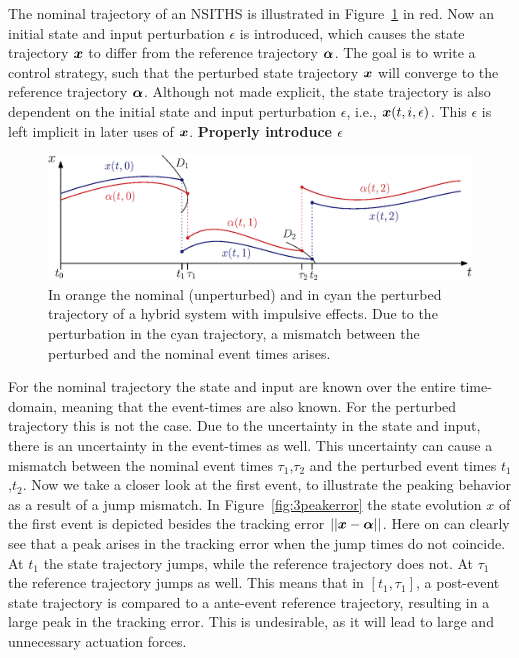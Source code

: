 \documentclass[../DC2017114Bouma.tex]{subfiles}
\begin{document}
The nominal trajectory of an NSITHS is illustrated in Figure~\ref{fig:3perturbedtraj} in red. Now an initial state and input perturbation $\epsilon$ is introduced, which causes the state trajectory ${\boldsymbol{x}}$ to differ from the reference trajectory $\boldsymbol{\alpha}$. The goal is to write a control strategy, such that the perturbed state trajectory ${\boldsymbol{x}}$ will converge to the reference trajectory $\boldsymbol{\alpha}$. Although not made explicit, the state trajectory is also dependent on the initial state and input perturbation $\epsilon$, i.e., ${\boldsymbol{x}}(t,i,\epsilon)$. This $\epsilon$ is left implicit in later uses of ${\boldsymbol{x}}$. \textbf{Properly introduce $\epsilon$}
%
%
\begin{figure}[h]
\centering
\includegraphics[width=.8\textwidth]{perturbedtraj.eps}\caption{In orange the nominal (unperturbed) and in cyan the perturbed trajectory of a hybrid system with impulsive effects. Due to the perturbation in the cyan trajectory, a mismatch between the perturbed and the nominal event times arises.} \label{fig:3perturbedtraj}
\end{figure}
For the nominal trajectory the state and input are known over the entire time-domain, meaning that the event-times are also known. For the perturbed trajectory this is not the case. Due to the uncertainty in the state and input, there is an uncertainty in the event-times as well. This uncertainty can cause a mismatch between the nominal event times $\tau_1$,$\tau_2$ and the perturbed event times $t_1$,$t_2$. Now we take a closer look at the first event, to illustrate the peaking behavior as a result of a jump mismatch. In Figure~\ref{fig:3peakerror} the state evolution $x$ of the first event is depicted besides the tracking error $||{\boldsymbol{x}}-\boldsymbol{\alpha}||$. Here on can clearly see that a peak arises in the tracking error when the jump times do not coincide. At $t_1$ the state trajectory jumps, while the reference trajectory does not. At $\tau_1$ the reference trajectory jumps as well. This means that in $[t_1,\tau_1]$, a post-event state trajectory is compared to a ante-event reference trajectory, resulting in a large peak in the tracking error. This is undesirable, as it will lead to large and unnecessary actuation forces.
\end{document}
